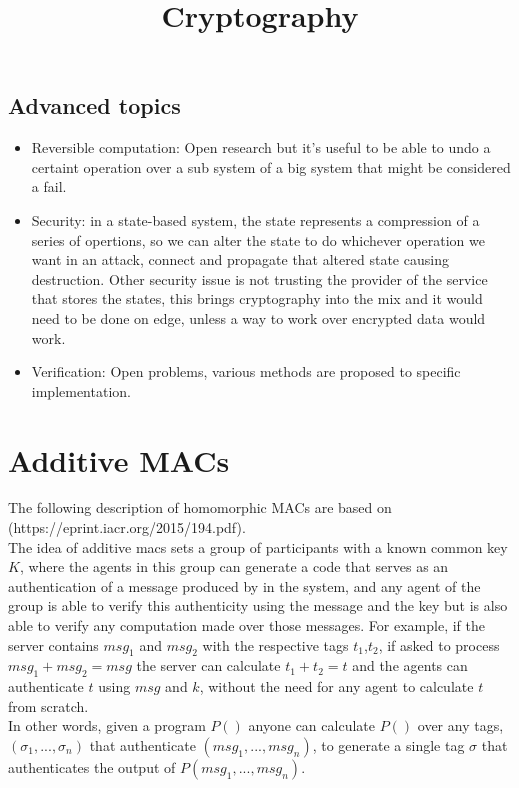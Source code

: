 \documentclass{article}
\begin{document}
\subsection{Advanced topics}
\begin{itemize}
    \item Reversible computation: Open research but it's useful to be able to undo a certaint operation over a sub system of a big system that might be considered a fail.
    \item Security: in a state-based system, the state represents a compression of a series of opertions, so we can alter the state to do whichever operation we want in an attack, connect and propagate that altered state causing destruction. Other security issue is not trusting the provider of the service that stores the states, this brings cryptography into the mix and it would need to be done on edge, unless a way to work over encrypted data would work.
    \item Verification: Open problems, various methods are proposed to specific implementation.
\end{itemize}
\newpage
\title{Cryptography}
\maketitle

\section{Additive MACs}

The following description of homomorphic MACs are based on (https://eprint.iacr.org/2015/194.pdf).\\

The idea of additive macs sets a group of participants with a known common key $K$, where the agents in this group can generate a code that serves as an authentication of a message produced by in the system, and any agent of the group is able to verify this authenticity using the message and the key but is also able to verify any computation made over those messages. For example, if the server contains $msg_1$ and $msg_2$ with the respective tags $t_1$,$t_2$, if asked to process $msg_1 + msg_2 = msg$ the server can calculate $t_1 + t_2 = t$ and the agents can authenticate $t$ using $msg$ and $k$, without the need for any agent to calculate $t$ from scratch.\\

In other words, given a program $P()$ anyone can calculate $P()$ over any tags, $(\sigma_1,...,\sigma_n)$ that authenticate $(msg_1,...,msg_n)$, to generate a single tag $\sigma$ that authenticates the output of $P(msg_1,...,msg_n)$.\\
\end{document}
